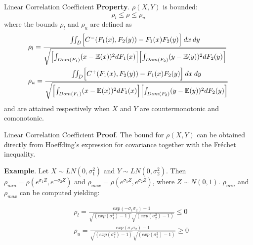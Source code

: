 \documentclass[11pt]{beamer}
\theoremstyle{plain}
\theoremstyle{definition}
\theoremstyle{remark}
\begin{document}
\begin{frame}{Linear Correlation Coefficient}
\noindent\textbf{Property}. $\rho(X,Y)$ is bounded:
$$
\rho_l \le \rho \le \rho_u
$$
where the bounds $\rho_l$ and $\rho_u$ are defined as
\footnotesize{
	\begin{equation}
	\begin{split}
	& \rho_l = \frac{\iint_D \Bigl[ C^-(F_1(x), F_2(y)) - F_1(x)F_2(y) \Bigr] \> dx\>dy}
	                        {\sqrt{
	                                  \Bigl[ \int_{Dom(F_1)}(x-\mathbb{E}(x))^2dF_1(x) \Bigr]
	                                  \Bigl[ \int_{Dom(F_2)}(y-\mathbb{E}(y))^2dF_2(y) \Bigr]
	                                 }
	                        } \\
	& \rho_u = \frac{\iint_D \Bigl[ C^+(F_1(x), F_2(y)) - F_1(x)F_2(y) \Bigr] \> dx\>dy}
	                        {\sqrt{
	                                  \Bigl[ \int_{Dom(F_1)}(x-\mathbb{E}(x))^2dF_1(x) \Bigr]
	                                  \Bigl[ \int_{Dom(F_2)}(y-\mathbb{E}(y))^2dF_2(y) \Bigr]
	                                 }
	                        } \\
	\end{split}
	\end{equation}
}
\normalsize
and are attained respectively when $X$ and $Y$ are countermonotonic and comonotonic.
\end{frame}
%
\begin{frame}{Linear Correlation Coefficient}
 \noindent\textbf{Proof}. The bound for $\rho(X,Y)$ can be obtained directly from Hoeffding's expression for covariance together with the Fréchet inequality. 
	
\bigskip	
\noindent\textbf{Example}. Let $X \sim LN(0, \sigma_1^2)$ and $Y \sim LN(0, \sigma_2^2)$. Then $\rho_{min} = \rho(e^{\sigma_1Z}, e^{-\sigma_2 Z})$ and $\rho_{max} = \rho(e^{\sigma_1Z}, e^{\sigma_2 Z})$, where $Z \sim N(0,1)$. $\rho_{min}$ and $\rho_{max}$ can be computed yielding:

\begin{equation}
\begin{split}
& \rho_l = \frac{exp(-\sigma_1 \sigma_2) - 1}
                        {
                         \sqrt{(exp(\sigma_1^2) - 1)}
                         \sqrt{(exp(\sigma_2^2) - 1)}
                        } \le 0 \\
& \rho_u = \frac{exp(\sigma_1 \sigma_2) - 1}
                        {
                         \sqrt{(exp(\sigma_1^2) - 1)}
                         \sqrt{(exp(\sigma_2^2) - 1)}
                        } \ge 0
\end{split}
\end{equation}

\end{frame}
\end{document}
